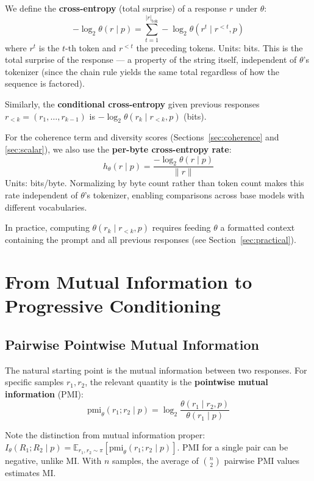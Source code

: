 \documentclass[11pt]{article}
\newcommand{\E}{\mathbb{E}}
\newcommand{\pmi}{\mathrm{pmi}}
\begin{document}
We define the \textbf{cross-entropy} (total surprise) of a response $r$ under $\theta$:
\begin{equation}\label{eq:total-xent}
    -\log_2 \theta(r \mid p) = \sum_{t=1}^{|r|_{\mathrm{tok}}} -\log_2 \theta(r^t \mid r^{<t}, p)
\end{equation}
where $r^t$ is the $t$-th token and $r^{<t}$ the preceding tokens. Units: bits. This is the total surprise of the response --- a property of the string itself, independent of $\theta$'s tokenizer (since the chain rule yields the same total regardless of how the sequence is factored).

Similarly, the \textbf{conditional cross-entropy} given previous responses $r_{<k} = (r_1, \ldots, r_{k-1})$ is $-\log_2 \theta(r_k \mid r_{<k}, p)$ (bits).

For the coherence term and diversity scores (Sections~\ref{sec:coherence} and \ref{sec:scalar}), we also use the \textbf{per-byte cross-entropy rate}:
\begin{equation}\label{eq:pertok}
    h_\theta(r \mid p) = \frac{-\log_2 \theta(r \mid p)}{\|r\|}
\end{equation}
Units: bits/byte. Normalizing by byte count rather than token count makes this rate independent of $\theta$'s tokenizer, enabling comparisons across base models with different vocabularies.

In practice, computing $\theta(r_k \mid r_{<k}, p)$ requires feeding $\theta$ a formatted context containing the prompt and all previous responses (see Section~\ref{sec:practical}).

\section{From Mutual Information to Progressive Conditioning}

\subsection{Pairwise Pointwise Mutual Information}

The natural starting point is the mutual information between two responses. For specific samples $r_1, r_2$, the relevant quantity is the \textbf{pointwise mutual information} (PMI):
\begin{equation}
    \pmi_\theta(r_1; r_2 \mid p) = \log_2 \frac{\theta(r_1 \mid r_2, p)}{\theta(r_1 \mid p)}
\end{equation}

Note the distinction from mutual information proper: $I_\theta(R_1; R_2 \mid p) = \E_{r_1, r_2 \sim \pi}[\pmi_\theta(r_1; r_2 \mid p)]$. PMI for a single pair can be negative, unlike MI. With $n$ samples, the average of $\binom{n}{2}$ pairwise PMI values estimates MI.
\end{document}
